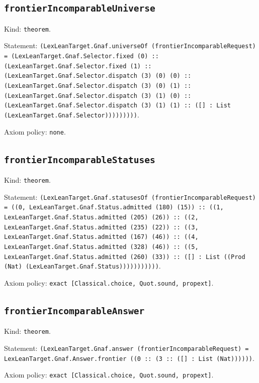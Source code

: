 \documentclass[11pt]{article}
\begin{document}
\subsection*{\texttt{frontierIncomparableUniverse}}
\noindent Kind: \texttt{theorem}.\par
\noindent Statement: \texttt{(LexLeanTarget.Gnaf.universeOf (frontierIncomparableRequest) = (LexLeanTarget.Gnaf.Selector.fixed (0) :: (LexLeanTarget.Gnaf.Selector.fixed (1) :: (LexLeanTarget.Gnaf.Selector.dispatch (3) (0) (0) :: (LexLeanTarget.Gnaf.Selector.dispatch (3) (0) (1) :: (LexLeanTarget.Gnaf.Selector.dispatch (3) (1) (0) :: (LexLeanTarget.Gnaf.Selector.dispatch (3) (1) (1) :: ([] : List (LexLeanTarget.Gnaf.Selector)))))))))}.\par
\noindent Axiom policy: \texttt{none}.\par
\subsection*{\texttt{frontierIncomparableStatuses}}
\noindent Kind: \texttt{theorem}.\par
\noindent Statement: \texttt{(LexLeanTarget.Gnaf.statusesOf (frontierIncomparableRequest) = ((0, LexLeanTarget.Gnaf.Status.admitted (180) (15)) :: ((1, LexLeanTarget.Gnaf.Status.admitted (205) (26)) :: ((2, LexLeanTarget.Gnaf.Status.admitted (235) (22)) :: ((3, LexLeanTarget.Gnaf.Status.admitted (167) (46)) :: ((4, LexLeanTarget.Gnaf.Status.admitted (328) (46)) :: ((5, LexLeanTarget.Gnaf.Status.admitted (260) (33)) :: ([] : List ((Prod (Nat) (LexLeanTarget.Gnaf.Status)))))))))))}.\par
\noindent Axiom policy: \texttt{exact [Classical.choice, Quot.sound, propext]}.\par
\subsection*{\texttt{frontierIncomparableAnswer}}
\noindent Kind: \texttt{theorem}.\par
\noindent Statement: \texttt{(LexLeanTarget.Gnaf.answer (frontierIncomparableRequest) = LexLeanTarget.Gnaf.Answer.frontier ((0 :: (3 :: ([] : List (Nat))))))}.\par
\noindent Axiom policy: \texttt{exact [Classical.choice, Quot.sound, propext]}.\par
\end{document}
